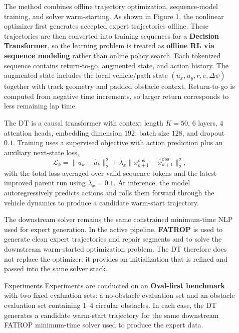 \documentclass[final]{beamer}
\newlength{\sepwidth}
\newlength{\colwidth}
\newcommand{\separatorcolumn}{\begin{column}{\sepwidth}\end{column}}
\begin{document}
\begin{frame}[t]
\begin{columns}[t]
\begin{column}{\colwidth}
\end{column}

\separatorcolumn

\begin{column}{\colwidth}
    \vspace{30pt}

\noindent The method combines offline trajectory optimization, sequence-model training, and solver warm-starting. As shown in Figure 1, the nonlinear optimizer first generates accepted expert trajectories offline. These trajectories are then converted into training sequences for a \textbf{Decision Transformer}, so the learning problem is treated as \textbf{offline RL via sequence modeling} rather than online policy search. Each tokenized sequence contains return-to-go, augmented state, and action history. The augmented state includes the local vehicle/path state $(u_x,u_y,r,e,\Delta\psi)$ together with track geometry and padded obstacle context. Return-to-go is computed from negative time increments, so larger return corresponds to less remaining lap time.

The DT is a causal transformer with context length $K=50$, $6$ layers, $4$ attention heads, embedding dimension $192$, batch size $128$, and dropout $0.1$. Training uses a supervised objective with action prediction plus an auxiliary next-state loss,
\[
 \mathcal{L}_k = \|u_k-\hat{u}_k\|_2^2 + \lambda_x \|x_{k+1}^{\mathrm{obs}}-\hat{x}_{k+1}^{\mathrm{obs}}\|_2^2,
\]
with the total loss averaged over valid sequence tokens and the latest improved parent run using $\lambda_x=0.1$. At inference, the model autoregressively predicts actions and rolls them forward through the vehicle dynamics to produce a candidate warm-start trajectory.

The downstream solver remains the same constrained minimum-time NLP used for expert generation. In the active pipeline, \textbf{FATROP} is used to generate clean expert trajectories and repair segments and to solve the downstream warm-started optimization problem. The DT therefore does not replace the optimizer: it provides an initialization that is refined and passed into the same solver stack.

\begin{block}{Experiments}
Experiments are conducted on an \textbf{Oval-first benchmark} with two fixed evaluation sets: a no-obstacle evaluation set and an obstacle evaluation set containing 1--4 circular obstacles. In each case, the DT generates a candidate warm-start trajectory for the same downstream FATROP minimum-time solver used to produce the expert data.


\end{block}
\end{column}
\end{columns}
\end{frame}
\end{document}
